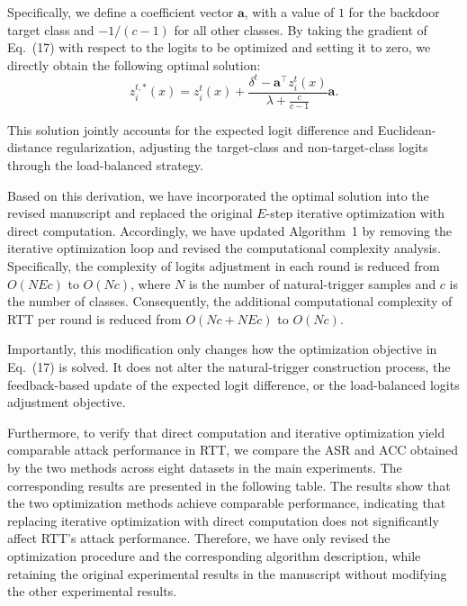 \documentclass[11pt,a4paper]{article}
\newcommand{\manualindent}{\par\noindent\hspace*{1.5em}\ignorespaces}
\begin{document}
{\manualindent Specifically, we define a coefficient vector $\mathbf{a}$, with a value of $1$ for the backdoor target class and $-1/(c-1)$ for all other classes.
By taking the gradient of Eq.~(17) with respect to the logits to be optimized and setting it to zero, we directly obtain the following optimal solution:
\begin{equation}
z_i^{t,*}(x)
=
z_i^t(x)
+
\frac{
\delta^t-\mathbf{a}^{\top}z_i^t(x)
}{
\lambda+\frac{c}{c-1}
}\mathbf{a}.
\end{equation}

\manualindent This solution jointly accounts for the expected logit difference and Euclidean-distance regularization, adjusting the target-class and non-target-class logits through the load-balanced strategy.

\manualindent Based on this derivation, we have incorporated the optimal solution into the revised manuscript and replaced the original $E$-step iterative optimization with direct computation.
Accordingly, we have updated Algorithm~1 by removing the iterative optimization loop and revised the computational complexity analysis.
Specifically, the complexity of logits adjustment in each round is reduced from $O(NEc)$ to $O(Nc)$, where $N$ is the number of natural-trigger samples and $c$ is the number of classes.
Consequently, the additional computational complexity of RTT per round is reduced from $O(Nc+NEc)$ to $O(Nc)$.

\manualindent Importantly, this modification only changes how the optimization objective in Eq.~(17) is solved.
It does not alter the natural-trigger construction process, the feedback-based update of the expected logit difference, or the load-balanced logits adjustment objective.

\manualindent Furthermore, to verify that direct computation and iterative optimization yield comparable attack performance in RTT, we compare the ASR and ACC obtained by the two methods across eight datasets in the main experiments.
The corresponding results are presented in the following table.
The results show that the two optimization methods achieve comparable performance, indicating that replacing iterative optimization with direct computation does not significantly affect RTT's attack performance.
Therefore, we have only revised the optimization procedure and the corresponding algorithm description, while retaining the original experimental results in the manuscript without modifying the other experimental results.

}
\end{document}

